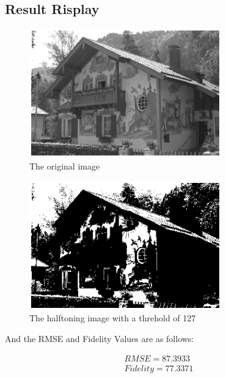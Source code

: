 \documentclass[paper=a4, fontsize=11pt]{scrartcl} %
\numberwithin{equation}{section} %
\numberwithin{figure}{section} %
\numberwithin{table}{section} %
\begin{document}
\subsection{Result Risplay}
\begin{figure}[H]
	
	\centering
	\includegraphics[height = 2.2in]{1.eps}
	\caption{The original image}
	
	
	
\end{figure}
\begin{figure}[H]
	
	\centering
	\includegraphics[height = 2.2in]{2.eps}
	\caption{The halftoning image with a threhold of 127}
	
	
	
\end{figure}
And the RMSE and Fidelity Values are as follows:

\begin{equation}
\begin{split}
RMSE = 87.3933\\
Fidelity =    77.3371\\
\end{split}
\end{equation}
\end{document}
